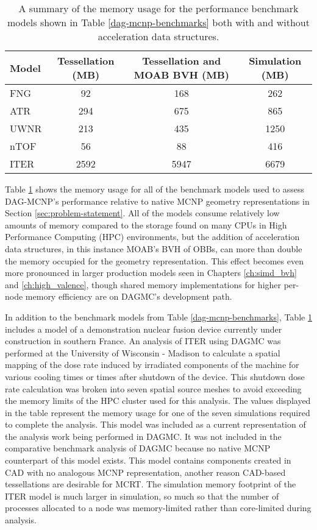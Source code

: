 \begin{table}[H]
    \centering
  \begin{tabular}{l c c c}
    \toprule
    Model & Tessellation (MB) & Tessellation and MOAB BVH (MB) & Simulation (MB) \\
    \hline
    FNG   & 92           & 168 & 262  \\
    ATR   & 294          & 675 & 865  \\
    UWNR  & 213          & 435 & 1250 \\
    nTOF  & 56           & 88  & 416  \\
    ITER  & 2592  & 5947 &  6679\\
    \hline
  \end{tabular}
  \caption[Memory summary of performance benchmark models.]{A summary of the
    memory usage for the performance benchmark models shown in Table
    \ref{dag-mcnp-benchmarks} both with and without acceleration data structures.}
  \label{tab:dag-mcnp-benchmarks-mem}
\end{table}

Table \ref{tab:dag-mcnp-benchmarks-mem} shows the memory usage for all of the
benchmark models used to assess DAG-MCNP's performance relative to native MCNP
geometry representations in Section \ref{sec:problem-statement}. All of the
models consume relatively low amounts of memory compared to the storage found on
many CPUs in High Performance Computing (HPC) environments, but the addition of
acceleration data structures, in this instance MOAB's BVH of OBBs, can more than
double the memory occupied for the geometry representation. This effect becomes
even more pronounced in larger production models seen in Chapters
\ref{ch:simd_bvh} and \ref{ch:high_valence}, though shared memory
implementations for higher per-node memory efficiency are on DAGMC's development
path.

In addition to the benchmark models from Table \ref{dag-mcnp-benchmarks}, Table
\ref{tab:dag-mcnp-benchmarks-mem} includes a model of a demonstration nuclear
fusion device currently under construction in southern France.  An analysis of
ITER using DAGMC was performed at the University of Wisconsin - Madison to
calculate a spatial mapping of the dose rate induced by irradiated components of
the machine for various cooling times or times after shutdown of the device.
This shutdown dose rate calculation was broken into seven spatial source meshes
to avoid exceeding the memory limits of the HPC cluster used for this
analysis. The values displayed in the table represent the memory usage for one
of the seven simulations required to complete the analysis. This model was
included as a current representation of the analysis work being performed in
DAGMC. It was not included in the comparative benchmark analysis of DAGMC
because no native MCNP counterpart of this model exists. This model contains
components created in CAD with no analogous MCNP representation, another reason
CAD-based tessellations are desirable for MCRT. The simulation memory footprint
of the ITER model is much larger in simulation, so much so that the number of
processes allocated to a node was memory-limited rather than core-limited during
analysis.

